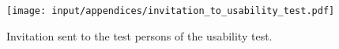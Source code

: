 
\begin{figure}%
	\begin{center}
	\texttt{[image: input/appendices/invitation\_to\_usability\_test.pdf]}
	\end{center}
\caption{Invitation sent to the test persons of the usability test.}%
\label{appendice:usability_test}%
\end{figure}